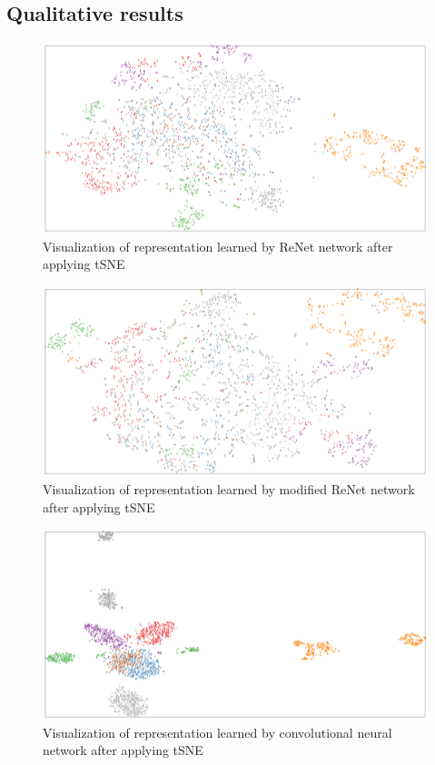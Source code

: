 \documentclass[a4paper, 10 pt, journal]{ieeeconf}
\begin{document}
\subsection{Qualitative results}

\begin{figure}
\centering
	\includegraphics[width=1.0\textwidth]{img/tSNE_ReNet.png}
	\caption{Visualization of representation learned by ReNet network after applying tSNE}
	\label{fig:tSNE_ReNet}
\end{figure}

\begin{figure}
\centering
	\includegraphics[width=1.0\textwidth]{img/tSNE_modif_ReNet.png}
	\caption{Visualization of representation learned by modified ReNet network after applying tSNE}
	\label{fig:tSNE_modif_ReNet}
\end{figure}

\begin{figure}
\centering
	\includegraphics[width=1.0\textwidth]{img/tSNE_conv.png}
	\caption{Visualization of representation learned by convolutional neural network after applying tSNE}
	\label{fig:tSNE_conv}
\end{figure}
\end{document}

